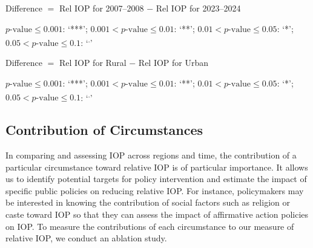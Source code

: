 \documentclass[12pt]{article}
\theoremstyle{plain}
\theoremstyle{definition}
\begin{document}
\begin{table}
    \centering
    \begin{threeparttable}
    \caption{Test for a decrease in relative IOP from 2007--2008 to 2023--2024}
    \label{tab:hyp_test_time}
    {\small
    }
    \begin{tablenotes}
        \footnotesize
        \item[a] Difference $=$ Rel IOP for 2007--2008 $-$ Rel IOP for 2023--2024
        \item[b] 
        $p\text{-value} \leq 0.001$: `***';\;
        $0.001 < p\text{-value} \leq 0.01$: `**';\;
        $0.01 < p\text{-value} \leq 0.05$: `*';\
        $0.05 < p\text{-value} \leq 0.1$: `\textsuperscript{.}'
    \end{tablenotes}
    \end{threeparttable}
\end{table}

\begin{table}
    \centering\small
    \begin{threeparttable}
    \caption{Test for difference in relative IOP between rural and urban sectors}
    \label{tab:hyp_test_sector}
    
    \begin{tablenotes}
        \footnotesize
        \item[a] Difference $=$ Rel IOP for Rural $-$ Rel IOP for Urban
        \item[b] 
        $p\text{-value} \leq 0.001$: `***';\;
        $0.001 < p\text{-value} \leq 0.01$: `**';\;
        $0.01 < p\text{-value} \leq 0.05$: `*';\
        $0.05 < p\text{-value} \leq 0.1$: `\textsuperscript{.}'
    \end{tablenotes}
    \end{threeparttable}
\end{table}

\subsection{Contribution of Circumstances}
\label{ssec:contrib_circum}
In comparing and assessing IOP across regions and time, the contribution of a particular circumstance toward relative IOP is of particular importance. It allows us to identify potential targets for policy intervention and estimate the impact of specific public policies on reducing relative IOP. For instance, policymakers may be interested in knowing the contribution of social factors such as religion or caste toward IOP so that they can assess the impact of affirmative action policies on IOP. To measure the contributions of each circumstance to our measure of relative IOP, we conduct an ablation study. 
\end{document}
